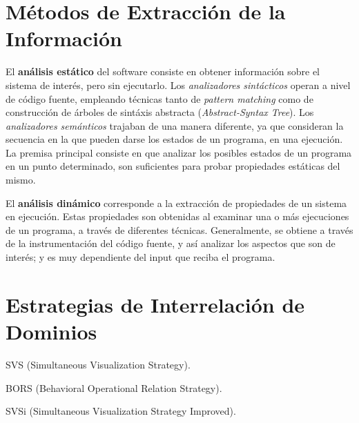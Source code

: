 \section{Métodos de Extracción de la Información}

El \textbf{análisis estático} del software consiste en obtener información sobre el 
sistema de interés, pero sin ejecutarlo.
Los \textit{analizadores sintácticos} operan a nivel de código fuente, empleando
técnicas tanto de \textit{pattern matching} como de construcción de árboles de sintáxis
abstracta (\textit{Abstract-Syntax Tree}).
Los \textit{analizadores semánticos} trajaban de una manera diferente, ya que consideran
la secuencia en la que pueden darse los estados de un programa, en una ejecución.
La premisa principal consiste en que analizar los posibles estados de un programa en un
punto determinado, son suficientes para probar propiedades estáticas del mismo.
\cite{Cousot77}

El \textbf{análisis dinámico} corresponde a la extracción de propiedades de un sistema
en ejecución.
Estas propiedades son obtenidas al examinar una o más ejecuciones de un programa, a
través de diferentes técnicas.
Generalmente, se obtiene a través de la instrumentación del código fuente, y así
analizar los aspectos que son de interés; y es muy dependiente del input que reciba
el programa.
\cite{Ball90}

\section{Estrategias de Interrelación de Dominios}

SVS (Simultaneous Visualization Strategy).

BORS (Behavioral Operational Relation Strategy).

SVSi (Simultaneous Visualization Strategy Improved).
